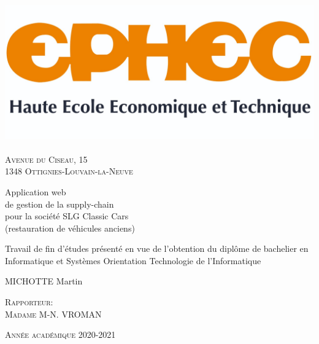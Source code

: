 \documentclass[french, 12pt, a4paper]{article}
\begin{document}
\singlespacing


\begin{titlepage}
\begin{center}

\includegraphics[width=15cm]{img/ephec.jpg}~\\
\textsc{Avenue du Ciseau, 15 \\ 1348 Ottignies-Louvain-la-Neuve} \\[1.5cm]

{\huge \bfseries \begin{spacing}{1.25}
  Application web \\ 
  de gestion de la supply-chain \\
  pour la société SLG Classic Cars \\
  \LARGE(restauration de véhicules anciens)
  \\[2cm]
  \end{spacing} 
} 

{\large 
  Travail de fin d'études présenté en vue de l'obtention du diplôme de bachelier
  en Informatique et Systèmes Orientation Technologie de l'Informatique
  \\[2cm]
}

{\LARGE 
  MICHOTTE Martin
}

\vspace*{\fill}
  
\end{center}

\begin{minipage}[t]{.5\textwidth}
  \textsc{\large Rapporteur:\\Madame M-N. VROMAN}
\end{minipage}
\begin{minipage}[br]{.5\textwidth}
  \textsc{\large Année académique 2020-2021}
\end{minipage}  

\end{titlepage}
\end{document}
